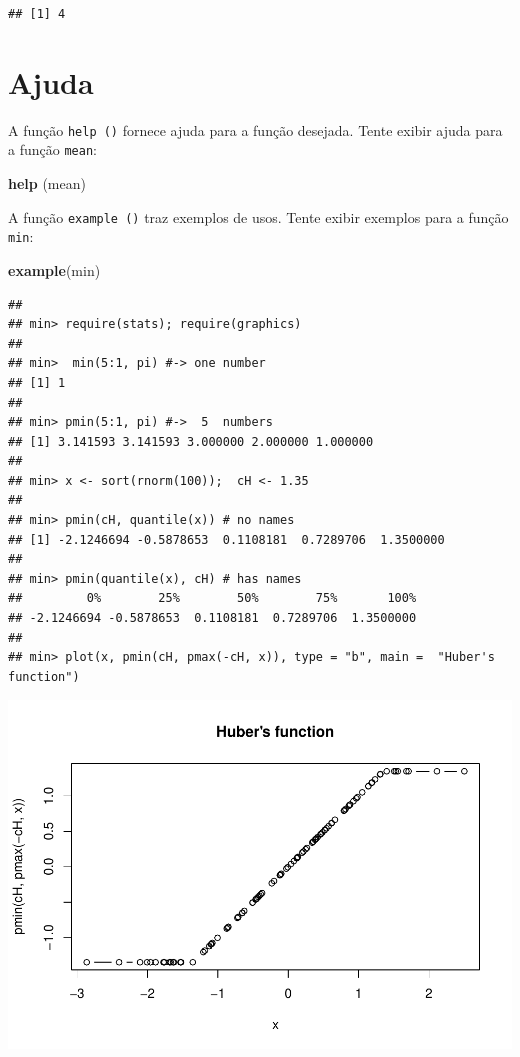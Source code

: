 \documentclass[
]{book}
\newenvironment{Shaded}{\begin{snugshade}}{\end{snugshade}}
\newcommand{\KeywordTok}[1]{\textcolor[rgb]{0.13,0.29,0.53}{\textbf{#1}}}
\newcommand{\NormalTok}[1]{#1}
\begin{document}
\begin{verbatim}
## [1] 4
\end{verbatim}

\hypertarget{ajuda}{%
\section{Ajuda}\label{ajuda}}

A função \texttt{help\ ()} fornece ajuda para a função desejada. Tente exibir ajuda para a função \texttt{mean}:

\begin{Shaded}
\begin{Highlighting}[]
\KeywordTok{help}\NormalTok{ (mean)}
\end{Highlighting}
\end{Shaded}

A função \texttt{example\ ()} traz exemplos de usos. Tente exibir exemplos para a função \texttt{min}:

\begin{Shaded}
\begin{Highlighting}[]
\KeywordTok{example}\NormalTok{(min)}
\end{Highlighting}
\end{Shaded}

\begin{verbatim}
## 
## min> require(stats); require(graphics)
## 
## min>  min(5:1, pi) #-> one number
## [1] 1
## 
## min> pmin(5:1, pi) #->  5  numbers
## [1] 3.141593 3.141593 3.000000 2.000000 1.000000
## 
## min> x <- sort(rnorm(100));  cH <- 1.35
## 
## min> pmin(cH, quantile(x)) # no names
## [1] -2.1246694 -0.5878653  0.1108181  0.7289706  1.3500000
## 
## min> pmin(quantile(x), cH) # has names
##         0%        25%        50%        75%       100% 
## -2.1246694 -0.5878653  0.1108181  0.7289706  1.3500000 
## 
## min> plot(x, pmin(cH, pmax(-cH, x)), type = "b", main =  "Huber's function")
\end{verbatim}

\includegraphics{TudodoR_files/figure-latex/unnamed-chunk-14-1.pdf}
\end{document}
